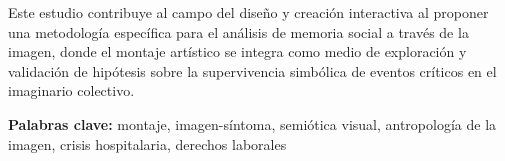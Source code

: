Este estudio contribuye al campo del diseño y creación interactiva al proponer una metodología específica para el análisis de memoria social a través de la imagen, donde el montaje artístico se integra como medio de exploración y validación de hipótesis sobre la supervivencia simbólica de eventos críticos en el imaginario colectivo.

\vspace{1cm}
\textbf{Palabras clave:} montaje, imagen-síntoma, semiótica visual, antropología de la imagen, crisis hospitalaria, derechos laborales
\pagebreak
